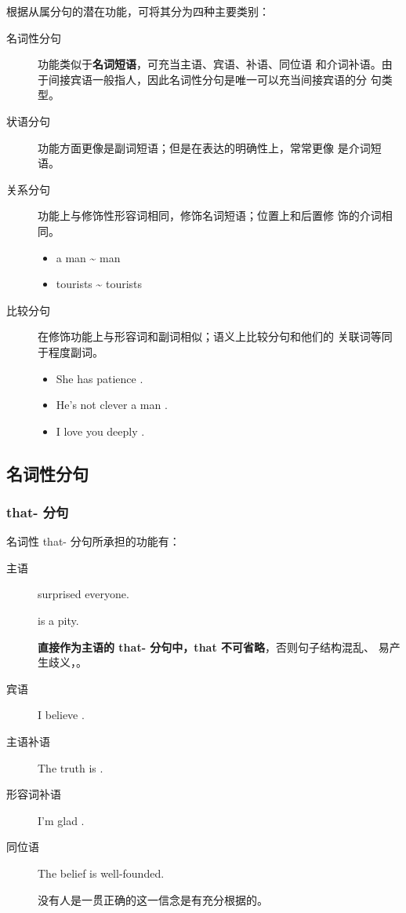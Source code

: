 根据从属分句的潜在功能，可将其分为四种主要类别：
\begin{description}
\item[名词性分句] 功能类似于\textbf{名词短语}，可充当主语、宾语、补语、同位语
  和介词补语。由于间接宾语一般指人，因此名词性分句是唯一可以充当间接宾语的分
  句类型。

\item[状语分句] 功能方面更像是副词短语；但是在表达的明确性上，常常更像
  是介词短语。

\item[关系分句] 功能上与修饰性形容词相同，修饰名词短语；位置上和后置修
  饰的介词相同。
  \begin{itemize}
  \item a man  \~{}  man
  \item tourists  \~{} tourists 
  \end{itemize}

\item[比较分句] 在修饰功能上与形容词和副词相似；语义上比较分句和他们的
  关联词等同于程度副词。
  \begin{itemize}
  \item She has  patience .
  \item He's not  clever a man .
  \item I love you  deeply .
  \end{itemize}
\end{description}

\subsection{名词性分句}

\subsubsection{that- 分句}
\label{subsub:thatclause}

名词性 that- 分句所承担的功能有：
\begin{description}
\item[主语]  surprised everyone.

   is a pity.

  \textbf{直接作为主语的 that- 分句中，that 不可省略}，否则句子结构混乱、
  易产生歧义，。

\item[宾语] I believe .
\item[主语补语] The truth is .
\item[形容词补语] I'm glad .

\item[同位语] The belief  is well-founded.

  没有人是一贯正确的这一信念是有充分根据的。
\end{description}

